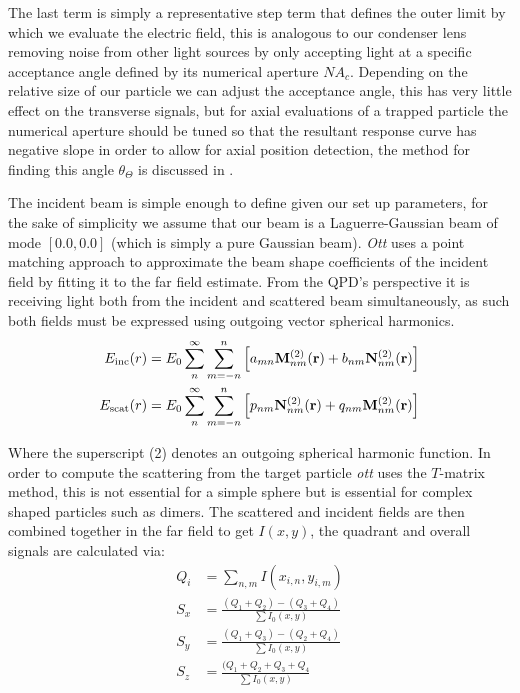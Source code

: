 The last term is simply a representative step term that defines 
the outer limit by which we evaluate the electric field, this is 
analogous to our condenser lens removing noise from other light 
sources by only accepting light at a specific acceptance angle 
defined by its numerical aperture $NA_c$. Depending on the 
relative size of our particle we can adjust the acceptance angle, 
this has very little effect on the transverse signals, but for 
axial evaluations of a trapped particle the numerical aperture 
should be tuned so that the resultant response curve has negative 
slope in order to allow for axial position detection, the method 
for finding this angle $\theta_\Theta$ is discussed in 
\cite{Friedrich2012}.

The incident beam is simple enough to define given our set up 
parameters, for the sake of simplicity we assume that our beam is a Laguerre-Gaussian 
beam of mode $[0.0, 0.0]$ (which is simply a pure Gaussian beam). 
\textit{Ott} uses a point matching approach to approximate the beam shape 
coefficients of the incident field by fitting it to the far field estimate. 
From the QPD's perspective it is receiving light both from the incident 
and scattered beam simultaneously, as such both fields must be expressed
using outgoing vector spherical harmonics.
\begin{align}
	E_{\rm inc}(r)&=
	E_0\sum^\infty_{n}\sum^n_{m=-n}\left[a_{mn}{\bf M}^{(2)}_{nm}({\bf r})+
	b_{nm}{\bf N}^{(2)}_{nm}({\bf r}) \right] 
	\\
	E_{\rm scat}(r)&=E_0 \sum^\infty_n \sum^n_{m=-n} \left[
	p_{nm}{\bf N}_{nm}^{(2)}({\bf r})+q_{nm}{\bf M}_{nm}^{(2)}({\bf r})
	\right] 
\end{align}

Where the superscript (2) denotes an outgoing spherical harmonic
function. In order to compute the scattering from the target particle \textit{ott} uses the $T$-matrix method, this is not essential 
for a simple sphere but is essential for complex shaped particles 
such as dimers. The scattered and incident fields are then combined 
together in the far field to get $I(x,y)$, the quadrant and overall 
signals are calculated via:
\begin{align}
	Q_i &= \sum_{n,m} I(x_{i,n}, y_{i,m}) \\
	S_{x} &= \frac{(Q_1+Q_2)-(Q_3+Q_4)}{\sum I_0(x,y)} \\
	S_{y} &= \frac{(Q_1+Q_3)-(Q_2+Q_4)}{\sum I_0(x,y)} \\
	S_{z} &= \frac{(Q_1+Q_2+Q_3+Q_4}{\sum I_0(x,y)}
\end{align}

